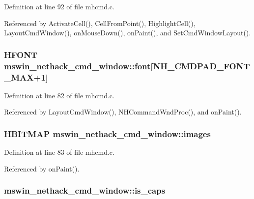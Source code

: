 Definition at line 92 of file mhcmd.\+c.



Referenced by Activate\+Cell(), Cell\+From\+Point(), Highlight\+Cell(), Layout\+Cmd\+Window(), on\+Mouse\+Down(), on\+Paint(), and Set\+Cmd\+Window\+Layout().

\hypertarget{structmswin__nethack__cmd__window_a78cd956720dc8bbd93d177563c27a5d0}{
\subsubsection[{font}]{\setlength{\rightskip}{0pt plus 5cm}H\+F\+O\+N\+T mswin\+\_\+nethack\+\_\+cmd\+\_\+window\+::font\mbox{[}{\bf N\+H\+\_\+\+C\+M\+D\+P\+A\+D\+\_\+\+F\+O\+N\+T\+\_\+\+M\+A\+X}+1\mbox{]}}}\label{structmswin__nethack__cmd__window_a78cd956720dc8bbd93d177563c27a5d0}


Definition at line 82 of file mhcmd.\+c.



Referenced by Layout\+Cmd\+Window(), N\+H\+Command\+Wnd\+Proc(), and on\+Paint().

\hypertarget{structmswin__nethack__cmd__window_a5bd2743549a8fb8f1402eadf322beba1}{
\subsubsection[{images}]{\setlength{\rightskip}{0pt plus 5cm}H\+B\+I\+T\+M\+A\+P mswin\+\_\+nethack\+\_\+cmd\+\_\+window\+::images}}\label{structmswin__nethack__cmd__window_a5bd2743549a8fb8f1402eadf322beba1}


Definition at line 83 of file mhcmd.\+c.



Referenced by on\+Paint().

\hypertarget{structmswin__nethack__cmd__window_a474681414472e8c3ea58b258af3abc42}{
\subsubsection[{is\+\_\+caps}]{ mswin\+\_\+nethack\+\_\+cmd\+\_\+window\+::is\+\_\+caps}}\label{structmswin__nethack__cmd__window_a474681414472e8c3ea58b258af3abc42}


